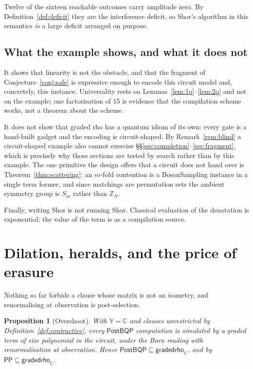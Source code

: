 \documentclass[11pt,a4paper]{article}
\theoremstyle{plain}
\newtheorem{proposition}[theorem]{Proposition}
\theoremstyle{definition}
\theoremstyle{remark}
\newcommand{\V}{\mathbb{V}}
\newcommand{\Cx}{\mathbb{C}}
\begin{document}
Twelve of the sixteen reachable outcomes carry amplitude zero. By
Definition~\ref{def:deficit} they are the interference deficit, so Shor's
algorithm in this semantics \emph{is} a large deficit arranged on purpose.

\subsection{What the example shows, and what it does not}

It shows that linearity is not the obstacle, and that the fragment of
Conjecture~\ref{conj:safe} is expressive enough to encode this circuit model
and, concretely, this instance. Universality rests on
Lemmas~\ref{lem:1q}--\ref{lem:2q} and not on the example; one factorisation of
$15$ is evidence that the compilation scheme works, not a theorem about the
scheme.

It does not show that graded rho has a quantum idiom of its own: every gate is a
hand-built gadget and the encoding is circuit-shaped. By
Remark~\ref{rem:blind} a circuit-shaped example also cannot exercise
\S\S\ref{sec:completion}--\ref{sec:fragment}, which is precisely why those
sections are tested by search rather than by this example. The one primitive the
design offers that a circuit does not hand over is
Theorem~\ref{thm:scattering}: an $m$-fold contention is a BosonSampling instance
\cite{AaronsonArkhipov} in a single term former, and since matchings are
permutation sets the ambient symmetry group is $S_m$ rather than $\mathbb{Z}_N$.

Finally, writing Shor is not running Shor. Classical evaluation of the
denotation is exponential; the value of the term is as a compilation source.

\section{Dilation, heralds, and the price of erasure}\label{sec:dilation}

Nothing so far forbids a clause whose matrix is not an isometry, and
renormalising at observation is post-selection.

\begin{proposition}[Overshoot]\label{prop:postbqp}
With $\V = \Cx$ and clauses unrestricted by
Definition~\ref{def:contractive}, every $\mathsf{PostBQP}$ computation is
simulated by a graded term of size polynomial in the circuit, under the Born
reading with renormalisation at observation. Hence
$\mathsf{PostBQP} \subseteq \mathsf{gradedrho}_{\Cx}$, and by
\cite{Aaronson} $\mathsf{PP} \subseteq \mathsf{gradedrho}_{\Cx}$.
\end{proposition}
\end{document}
